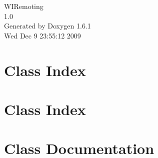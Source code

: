 \documentclass[letterpaper]{book}
\begin{document}
\hypersetup{pageanchor=false}
\begin{titlepage}
\vspace*{7cm}
\begin{center}
{\Large WIRemoting \\[1ex]\large 1.0 }\\
\vspace*{1cm}
{\large Generated by Doxygen 1.6.1}\\
\vspace*{0.5cm}
{\small Wed Dec 9 23:55:12 2009}\\
\end{center}
\end{titlepage}
\clearemptydoublepage
{}
\tableofcontents
\clearemptydoublepage
{}
\hypersetup{pageanchor=true}
\chapter{Class Index}

\chapter{Class Index}

\chapter{Class Documentation}


























\printindex
\end{document}
